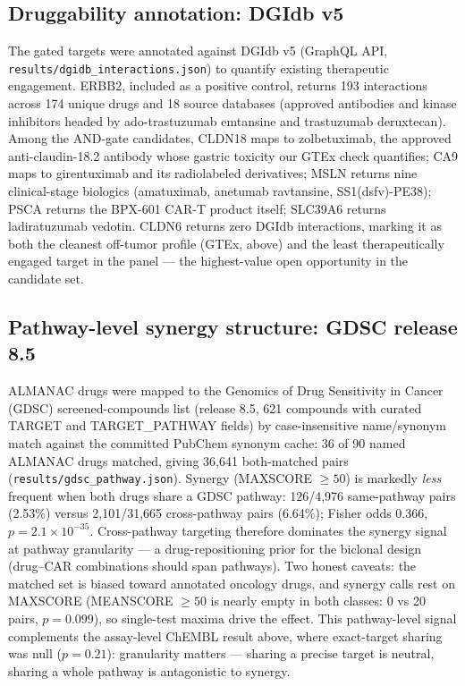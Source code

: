 \documentclass[11pt]{article}
\begin{document}
\subsection{Druggability annotation: DGIdb v5}
The gated targets were annotated against DGIdb v5 (GraphQL API,
\texttt{results/dgidb\_interactions.json}) to quantify existing
therapeutic engagement. ERBB2, included as a positive control, returns
193 interactions across 174 unique drugs and 18 source databases
(approved antibodies and kinase inhibitors headed by ado-trastuzumab
emtansine and trastuzumab deruxtecan). Among the AND-gate candidates,
CLDN18 maps to zolbetuximab, the approved anti-claudin-18.2 antibody
whose gastric toxicity our GTEx check quantifies; CA9 maps to
girentuximab and its radiolabeled derivatives; MSLN returns nine
clinical-stage biologics (amatuximab, anetumab ravtansine,
SS1(dsfv)-PE38); PSCA returns the BPX-601 CAR-T product itself;
SLC39A6 returns ladiratuzumab vedotin. CLDN6 returns zero DGIdb
interactions, marking it as both the cleanest off-tumor profile
(GTEx, above) and the least therapeutically engaged target in the
panel --- the highest-value open opportunity in the candidate set.


\subsection{Pathway-level synergy structure: GDSC release 8.5}
ALMANAC drugs were mapped to the Genomics of Drug Sensitivity in Cancer
(GDSC) screened-compounds list (release 8.5, 621 compounds with curated
TARGET and TARGET\_PATHWAY fields) by case-insensitive name/synonym match
against the committed PubChem synonym cache: 36 of 90 named ALMANAC drugs
matched, giving 36{,}641 both-matched pairs
(\texttt{results/gdsc\_pathway.json}). Synergy (MAXSCORE $\ge 50$) is
markedly \emph{less} frequent when both drugs share a GDSC pathway:
126/4{,}976 same-pathway pairs (2.53\%) versus 2{,}101/31{,}665
cross-pathway pairs (6.64\%); Fisher odds 0.366, $p = 2.1\times10^{-35}$.
Cross-pathway targeting therefore dominates the synergy signal at pathway
granularity --- a drug-repositioning prior for the biclonal design
(drug--CAR combinations should span pathways). Two honest caveats: the
matched set is biased toward annotated oncology drugs, and synergy calls
rest on MAXSCORE (MEANSCORE $\ge 50$ is nearly empty in both classes:
0 vs 20 pairs, $p=0.099$), so single-test maxima drive the effect. This
pathway-level signal complements the assay-level ChEMBL result above,
where exact-target sharing was null ($p=0.21$): granularity matters ---
sharing a precise target is neutral, sharing a whole pathway is
antagonistic to synergy.
\end{document}
